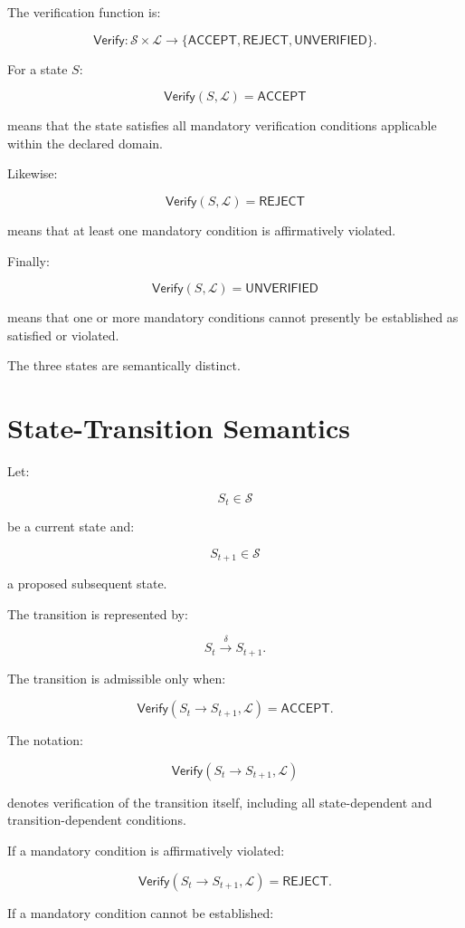 \documentclass[11pt]{article}
\newcommand{\State}{\mathcal{S}}
\newcommand{\Law}{\mathcal{L}}
\newcommand{\Verify}{\mathsf{Verify}}
\newcommand{\Accept}{\mathsf{ACCEPT}}
\newcommand{\Reject}{\mathsf{REJECT}}
\newcommand{\Unknown}{\mathsf{UNVERIFIED}}
\begin{document}
The verification function is:

\[
\boxed{
\Verify:
\State\times\Law
\rightarrow
\{
\Accept,\Reject,\Unknown
\}.
}
\]

For a state $S$:

\[
\Verify(S,\Law)=\Accept
\]

means that the state satisfies all mandatory verification
conditions applicable within the declared domain.

Likewise:

\[
\Verify(S,\Law)=\Reject
\]

means that at least one mandatory condition is affirmatively
violated.

Finally:

\[
\Verify(S,\Law)=\Unknown
\]

means that one or more mandatory conditions cannot presently be
established as satisfied or violated.

The three states are semantically distinct.

\section{State-Transition Semantics}

Let:

\[
S_t\in\State
\]

be a current state and:

\[
S_{t+1}\in\State
\]

a proposed subsequent state.

The transition is represented by:

\[
S_t\xrightarrow{\delta}S_{t+1}.
\]

The transition is admissible only when:

\[
\boxed{
\Verify(S_t\rightarrow S_{t+1},\Law)=\Accept.
}
\]

The notation:

\[
\Verify(S_t\rightarrow S_{t+1},\Law)
\]

denotes verification of the transition itself, including all
state-dependent and transition-dependent conditions.

If a mandatory condition is affirmatively violated:

\[
\boxed{
\Verify(S_t\rightarrow S_{t+1},\Law)=\Reject.
}
\]

If a mandatory condition cannot be established:
\end{document}
